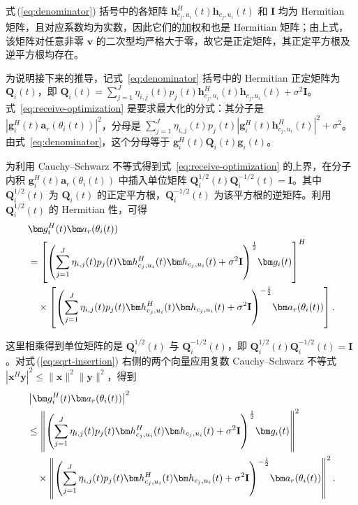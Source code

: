 \begin{samepage}
式\,(\ref{eq:denominator}) 括号中的各矩阵 $\bm h_{c_j,u_i}^{H}(t)\bm h_{c_j,u_i}(t)$ 和 $\mathbf I$ 均为 Hermitian 矩阵，且对应系数均为实数，因此它们的加权和也是 Hermitian 矩阵；由上式，该矩阵对任意非零 $\bm v$ 的二次型均严格大于零，故它是正定矩阵，其正定平方根及逆平方根均存在。

为说明接下来的推导，记式~\eqref{eq:denominator} 括号中的 Hermitian 正定矩阵为 $\mathbf Q_i(t)$，即 $\mathbf Q_i(t)=\sum_{j=1}^{J}\eta_{i,j}(t)p_j(t)\bm h_{c_j,u_i}^{H}(t)\bm h_{c_j,u_i}(t)+\sigma^2\mathbf I$。式~\eqref{eq:receive-optimization} 是要求最大化的分式：其分子是 $|\bm g_i^H(t)\bm a_r(\theta_i(t))|^2$，分母是 $\sum_{j=1}^{J}\eta_{i,j}(t)p_j(t)|\bm g_i^H(t)\bm h_{c_j,u_i}^{H}(t)|^2+\sigma^2$。由式~\eqref{eq:denominator}，这个分母等于 $\bm g_i^H(t)\mathbf Q_i(t)\bm g_i(t)$。

为利用 Cauchy--Schwarz 不等式得到式~\eqref{eq:receive-optimization} 的上界，在分子内积 $\bm g_i^H(t)\bm a_r(\theta_i(t))$ 中插入单位矩阵 $\mathbf Q_i^{1/2}(t)\mathbf Q_i^{-1/2}(t)=\mathbf I$。其中 $\mathbf Q_i^{1/2}(t)$ 为 $\mathbf Q_i(t)$ 的正定平方根，$\mathbf Q_i^{-1/2}(t)$ 为该平方根的逆矩阵。利用 $\mathbf Q_i^{1/2}(t)$ 的 Hermitian 性，可得
\begin{align}\label{eq:sqrt-insertion}
&\bm g_i^H(t)\bm a_r(\theta_i(t))\notag\\
&=\left[\left(\sum_{j=1}^J\eta_{i,j}(t)p_j(t)
\bm h_{c_j,u_i}^{H}(t)\bm h_{c_j,u_i}(t)+\sigma^2\mathbf I\right)^{\frac12}\!\bm g_i(t)\right]^H\notag\\
&\quad\times\left[\left(\sum_{j=1}^J\eta_{i,j}(t)p_j(t)
\bm h_{c_j,u_i}^{H}(t)\bm h_{c_j,u_i}(t)+\sigma^2\mathbf I\right)^{-\frac12}\!\bm a_r(\theta_i(t))\right].
\end{align}
\end{samepage}
\begin{samepage}
这里相乘得到单位矩阵的是 $\mathbf Q_i^{1/2}(t)$ 与 $\mathbf Q_i^{-1/2}(t)$，即 $\mathbf Q_i^{1/2}(t)\mathbf Q_i^{-1/2}(t)=\mathbf I$。对式\,(\ref{eq:sqrt-insertion}) 右侧的两个向量应用复数 Cauchy--Schwarz 不等式 $|\bm x^H\bm y|^2\le\|\bm x\|^2\|\bm y\|^2$，得到
\begin{align}\label{eq:cs-norms}
&\left|\bm g_i^H(t)\bm a_r(\theta_i(t))\right|^2\notag\\
&\le\left\|\left(\sum_{j=1}^J\eta_{i,j}(t)p_j(t)
\bm h_{c_j,u_i}^{H}(t)\bm h_{c_j,u_i}(t)+\sigma^2\mathbf I\right)^{\frac12}\!\bm g_i(t)\right\|^2\notag\\
&\quad\times\left\|\left(\sum_{j=1}^J\eta_{i,j}(t)p_j(t)
\bm h_{c_j,u_i}^{H}(t)\bm h_{c_j,u_i}(t)+\sigma^2\mathbf I\right)^{-\frac12}\!\bm a_r(\theta_i(t))\right\|^2.
\end{align}
\end{samepage}
